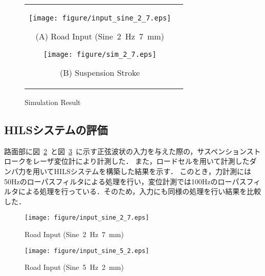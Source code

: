 \documentclass[a4paper,12pt]{article_vdlab_sotsuron}
\begin{document}
\vspace{15mm}
\begin{figure}[h]
    \begin{tabular}{cc}
      \begin{minipage}{0.45\hsize}
	\centering
	  \texttt{[image: figure/input\_sine\_2\_7.eps]}
	  \begin{center}
	  \vspace{2mm}
	  \ (A) Road Input (Sine~2~Hz~7~mm)\
	  \end{center}
	\end{minipage}
       \begin{minipage}{0.5\hsize}
	\centering
	  \texttt{[image: figure/sim\_2\_7.eps]}
	  \begin{center}
	  \vspace{2mm}
	  \ (B) Suspension Stroke\
	  \end{center}
      \end{minipage}
    \end{tabular}
    \vspace{2mm}
    \caption{Simulation Result}
    \label{fig:sim}
\end{figure}

\newpage
\subsection{HILSシステムの評価}
路面部に図~\ref{fig:sine2}~と図~\ref{fig:sine5}~に示す正弦波状の入力を与えた際の，サスペンションストロークをレーザ変位計により計測した．
また，ロードセルを用いて計測したダンパ力を用いてHILSシステムを構築した結果を示す．
このとき，力計測には50Hzのローパスフィルタによる処理を行い，変位計測では100Hzのローパスフィルタによる処理を行っている．そのため，入力にも同様の処理を行い結果を比較した．
\vspace{15mm}
\begin{figure}[h]
  \centering
   \texttt{[image: figure/input\_sine\_2\_7.eps]}
  \vspace{2mm}
\caption{Road Input (Sine~2~Hz~7~mm)}
  \label{fig:sine2}
\end{figure}

\vspace{15mm}
\begin{figure}[h]
  \centering
   \texttt{[image: figure/input\_sine\_5\_2.eps]}
  \vspace{2mm}
\caption{Road Input (Sine~5~Hz~2~mm)}
  \label{fig:sine5}
\end{figure}
\end{document}
